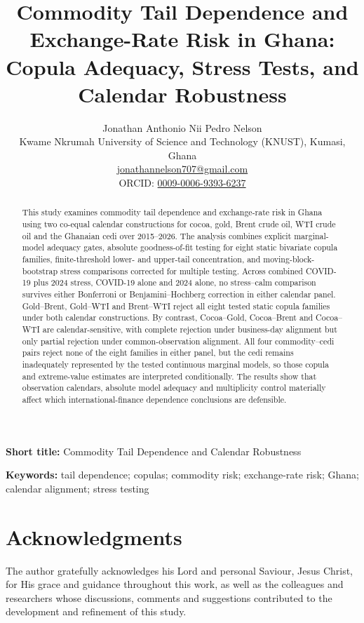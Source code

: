 \documentclass[12pt,a4paper]{article}
\title{Commodity Tail Dependence and Exchange-Rate Risk in Ghana:\\Copula Adequacy, Stress Tests, and Calendar Robustness}
\author{Jonathan Anthonio Nii Pedro Nelson\\Kwame Nkrumah University of Science and Technology (KNUST), Kumasi, Ghana\\\href{mailto:jonathannelson707@gmail.com}{jonathannelson707@gmail.com}\\ORCID: \href{https://orcid.org/0009-0006-9393-6237}{0009-0006-9393-6237}}
\date{}
\begin{document}
\maketitle

\noindent\textbf{Short title:} Commodity Tail Dependence and Calendar Robustness

\begin{abstract}
This study examines commodity tail dependence and exchange-rate risk in Ghana using two co-equal calendar constructions for cocoa, gold, Brent crude oil, WTI crude oil and the Ghanaian cedi over 2015--2026. The analysis combines explicit marginal-model adequacy gates, absolute goodness-of-fit testing for eight static bivariate copula families, finite-threshold lower- and upper-tail concentration, and moving-block-bootstrap stress comparisons corrected for multiple testing. Across combined COVID-19 plus 2024 stress, COVID-19 alone and 2024 alone, no stress--calm comparison survives either Bonferroni or Benjamini--Hochberg correction in either calendar panel. Gold--Brent, Gold--WTI and Brent--WTI reject all eight tested static copula families under both calendar constructions. By contrast, Cocoa--Gold, Cocoa--Brent and Cocoa--WTI are calendar-sensitive, with complete rejection under business-day alignment but only partial rejection under common-observation alignment. All four commodity--cedi pairs reject none of the eight families in either panel, but the cedi remains inadequately represented by the tested continuous marginal models, so those copula and extreme-value estimates are interpreted conditionally. The results show that observation calendars, absolute model adequacy and multiplicity control materially affect which international-finance dependence conclusions are defensible.
\end{abstract}

\noindent\textbf{Keywords:} tail dependence; copulas; commodity risk; exchange-rate risk; Ghana; calendar alignment; stress testing







\section*{Acknowledgments}
The author gratefully acknowledges his Lord and personal Saviour, Jesus Christ, for His grace and guidance throughout this work, as well as the colleagues and researchers whose discussions, comments and suggestions contributed to the development and refinement of this study.
\end{document}
